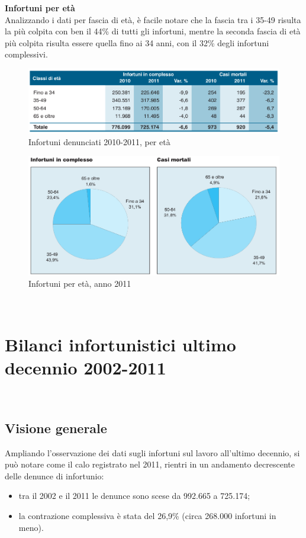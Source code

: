 \textbf{Infortuni per età}\\
Analizzando i dati per fascia di età, è facile notare che la fascia tra i 35-49 risulta la più colpita con ben il 44\% di tutti gli infortuni, mentre la seconda fascia di età più colpita risulta essere quella fino ai 34 anni, con il 32\% degli infortuni complessivi.

\begin{figure}[H]
\centering
\includegraphics[scale=0.5]{images/cap4/analisiDiMercato/infortuniPerEta1}
\caption{Infortuni denunciati 2010-2011, per età}
\end{figure}

\begin{figure}[H]
\centering
\includegraphics[scale=0.53]{images/cap4/analisiDiMercato/infortuniPerEta2}
\caption{Infortuni per età, anno 2011}
\end{figure}







\ \ \
\section{Bilanci infortunistici ultimo decennio 2002-2011}
\ \
\subsection{Visione generale}

Ampliando l'osservazione dei dati sugli infortuni sul lavoro all'ultimo decennio, si può notare come il calo registrato nel 2011, rientri in un andamento decrescente delle denunce di infortunio:
\begin{itemize}
\item tra il 2002 e il 2011 le denunce sono scese da 992.665 a 725.174;
\item la contrazione complessiva è stata del 26,9\% (circa 268.000 infortuni in meno).
\end{itemize}



